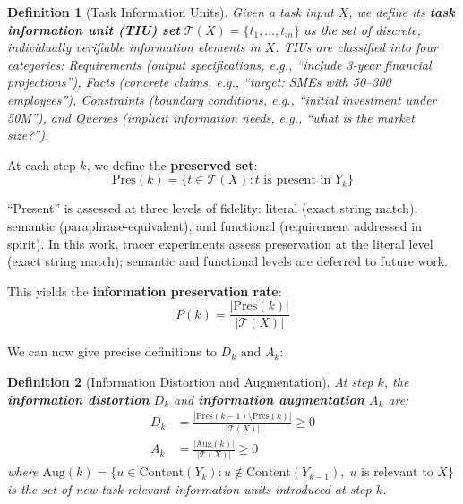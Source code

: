 \documentclass[conference]{IEEEtran}
\newtheorem{definition}{Definition}
\begin{document}
\begin{definition}[Task Information Units]
\label{def:tiu}
Given a task input $X$, we define its \textbf{task information unit (TIU) set} $\mathcal{T}(X) = \{t_1, \ldots, t_m\}$ as the set of discrete, individually verifiable information elements in $X$.
TIUs are classified into four categories:
\emph{Requirements} (output specifications, e.g., ``include 3-year financial projections''),
\emph{Facts} (concrete claims, e.g., ``target: SMEs with 50--300 employees''),
\emph{Constraints} (boundary conditions, e.g., ``initial investment under \textyen 50M''), and
\emph{Queries} (implicit information needs, e.g., ``what is the market size?'').
\end{definition}

At each step $k$, we define the \textbf{preserved set}:
\begin{equation}
    \text{Pres}(k) = \{ t \in \mathcal{T}(X) : t \text{ is present in } Y_k \}
\end{equation}

``Present'' is assessed at three levels of fidelity:
literal (exact string match), semantic (paraphrase-equivalent), and functional (requirement addressed in spirit).
In this work, tracer experiments assess preservation at the literal level (exact string match); semantic and functional levels are deferred to future work.

This yields the \textbf{information preservation rate}:
\begin{equation}
    P(k) = \frac{|\text{Pres}(k)|}{|\mathcal{T}(X)|}
    \label{eq:preservation}
\end{equation}

We can now give precise definitions to $D_k$ and $A_k$:

\begin{definition}[Information Distortion and Augmentation]
\label{def:dk_ak}
At step $k$, the \textbf{information distortion} $D_k$ and \textbf{information augmentation} $A_k$ are:
\begin{align}
    D_k &= \frac{|\text{Pres}(k{-}1) \setminus \text{Pres}(k)|}{|\mathcal{T}(X)|} \geq 0 \label{eq:dk} \\
    A_k &= \frac{|\text{Aug}(k)|}{|\mathcal{T}(X)|} \geq 0 \label{eq:ak}
\end{align}
where $\text{Aug}(k) = \{ u \in \text{Content}(Y_k) : u \notin \text{Content}(Y_{k-1}),\; u \text{ is relevant to } X \}$ is the set of new task-relevant information units introduced at step $k$.
\end{definition}
\end{document}
